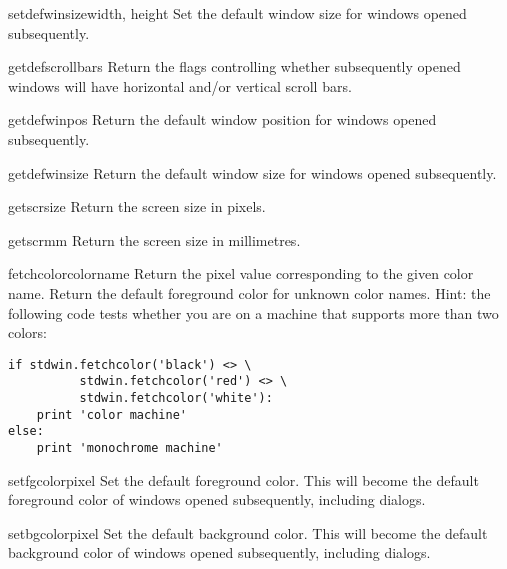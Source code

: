 \begin{funcdesc}{setdefwinsize}{width, height}
Set the default window size for windows opened subsequently.
\end{funcdesc}

\begin{funcdesc}{getdefscrollbars}{}
Return the flags controlling whether subsequently opened windows will
have horizontal and/or vertical scroll bars.
\end{funcdesc}

\begin{funcdesc}{getdefwinpos}{}
Return the default window position for windows opened subsequently.
\end{funcdesc}

\begin{funcdesc}{getdefwinsize}{}
Return the default window size for windows opened subsequently.
\end{funcdesc}

\begin{funcdesc}{getscrsize}{}
Return the screen size in pixels.
\end{funcdesc}

\begin{funcdesc}{getscrmm}{}
Return the screen size in millimetres.
\end{funcdesc}

\begin{funcdesc}{fetchcolor}{colorname}
Return the pixel value corresponding to the given color name.
Return the default foreground color for unknown color names.
Hint: the following code tests whether you are on a machine that
supports more than two colors:
\begin{verbatim}
if stdwin.fetchcolor('black') <> \
          stdwin.fetchcolor('red') <> \
          stdwin.fetchcolor('white'):
    print 'color machine'
else:
    print 'monochrome machine'
\end{verbatim}
\end{funcdesc}

\begin{funcdesc}{setfgcolor}{pixel}
Set the default foreground color.
This will become the default foreground color of windows opened
subsequently, including dialogs.
\end{funcdesc}

\begin{funcdesc}{setbgcolor}{pixel}
Set the default background color.
This will become the default background color of windows opened
subsequently, including dialogs.
\end{funcdesc}

